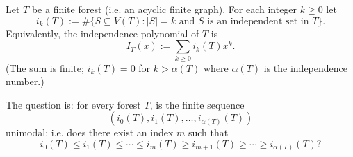 Let $T$ be a finite forest (i.e. an acyclic finite graph).  For each integer $k\ge 0$ let
\[
 i_k(T) := \#\{S\subseteq V(T): |S|=k\text{ and $S$ is an independent set in }T\}.
\]
Equivalently, the independence polynomial of $T$ is
\[
 I_T(x) := \sum_{k\ge 0} i_k(T) x^k.
\]
(The sum is finite; $i_k(T)=0$ for $k>\alpha(T)$ where $\alpha(T)$ is the independence number.)

The question is: for every forest $T$, is the finite sequence
\[
(i_0(T),i_1(T),\dots,i_{\alpha(T)}(T))
\]
unimodal; i.e. does there exist an index $m$ such that
\[
 i_0(T)\le i_1(T)\le\cdots\le i_m(T)\ge i_{m+1}(T)\ge\cdots\ge i_{\alpha(T)}(T)?
\]
